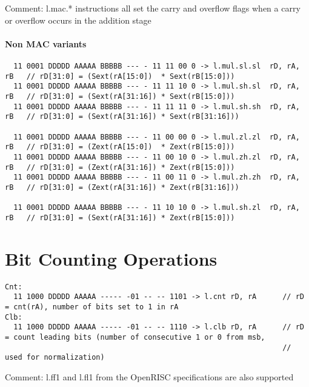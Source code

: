 \begin{landscape}
Comment: l.mac.* instructions all set the carry and overflow flags when a carry or overflow occurs in the addition stage


\paragraph{Non MAC variants}
\begin{verbatim}
  11 0001 DDDDD AAAAA BBBBB --- - 11 11 00 0 -> l.mul.sl.sl  rD, rA, rB   // rD[31:0] = (Sext(rA[15:0])  * Sext(rB[15:0]))
  11 0001 DDDDD AAAAA BBBBB --- - 11 11 10 0 -> l.mul.sh.sl  rD, rA, rB   // rD[31:0] = (Sext(rA[31:16]) * Sext(rB[15:0]))
  11 0001 DDDDD AAAAA BBBBB --- - 11 11 11 0 -> l.mul.sh.sh  rD, rA, rB   // rD[31:0] = (Sext(rA[31:16]) * Sext(rB[31:16]))

  11 0001 DDDDD AAAAA BBBBB --- - 11 00 00 0 -> l.mul.zl.zl  rD, rA, rB   // rD[31:0] = (Zext(rA[15:0])  * Zext(rB[15:0]))
  11 0001 DDDDD AAAAA BBBBB --- - 11 00 10 0 -> l.mul.zh.zl  rD, rA, rB   // rD[31:0] = (Zext(rA[31:16]) * Zext(rB[15:0]))
  11 0001 DDDDD AAAAA BBBBB --- - 11 00 11 0 -> l.mul.zh.zh  rD, rA, rB   // rD[31:0] = (Zext(rA[31:16]) * Zext(rB[31:16]))

  11 0001 DDDDD AAAAA BBBBB --- - 11 10 10 0 -> l.mul.sh.zl  rD, rA, rB   // rD[31:0] = (Sext(rA[31:16]) * Zext(rB[15:0]))
\end{verbatim}


\newpage
\section{Bit Counting Operations}

\begin{verbatim}
Cnt:
  11 1000 DDDDD AAAAA ----- -01 -- -- 1101 -> l.cnt rD, rA      // rD = cnt(rA), number of bits set to 1 in rA
Clb:
  11 1000 DDDDD AAAAA ----- -01 -- -- 1110 -> l.clb rD, rA      // rD = count leading bits (number of consecutive 1 or 0 from msb,
                                                                // used for normalization)
\end{verbatim}

Comment: l.ff1 and l.fl1 from the OpenRISC specifications are also supported

\end{landscape}
\restoregeometry
